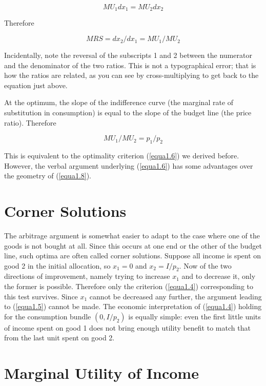\begin{equation*}
MU_1 dx_1 = MU_2 dx_2
\end{equation*} 

Therefore

\begin{equation}\label{equa1.7}
MRS = dx_2 / dx_1 = MU_1 / MU_2
\end{equation} 

Incidentally, note the reversal of the subscripts 1 and 2 between the numerator and the denominator of the two ratios. This is not a typographical error; that is how the ratios are related, as you can see by cross-multiplying to get back to the equation just above.

At the optimum, the slope of the indifference curve (the marginal rate of substitution in consumption) is equal to the slope of the budget line (the price ratio). Therefore

\begin{equation}\label{equa1.8}
MU_1 / MU_2 = p_1 / p_2
\end{equation} 

This is equivalent to the optimality criterion (\ref{equa1.6}) we derived before. However, the verbal argument underlying (\ref{equa1.6}) has some advantages over the geometry of (\ref{equa1.8}). 

\section*{Corner Solutions}

The arbitrage argument is somewhat easier to adapt to the case where one of the goods is not bought at all. Since this occurs at one end or the other of the budget line, such optima are often called corner solutions. Suppose all income is spent on good 2 in the initial allocation, so $x_1 = 0$ and $x_2 = I/p_2$. Now of the two directions of improvement, namely trying to increase $x_1$ and to decrease it, only the former is possible. Therefore only the criterion (\ref{equa1.4}) corresponding to this test survives. Since $x_1$ cannot be decreased any further, the argument leading to (\ref{equa1.5}) cannot be made. The economic interpretation of (\ref{equa1.4}) holding for the consumption bundle $(0, I/p_2)$ is equally simple: even the first little units of income spent on good 1 does not bring enough utility benefit to match that from the last unit spent on good 2.

\section*{Marginal Utility of Income}


